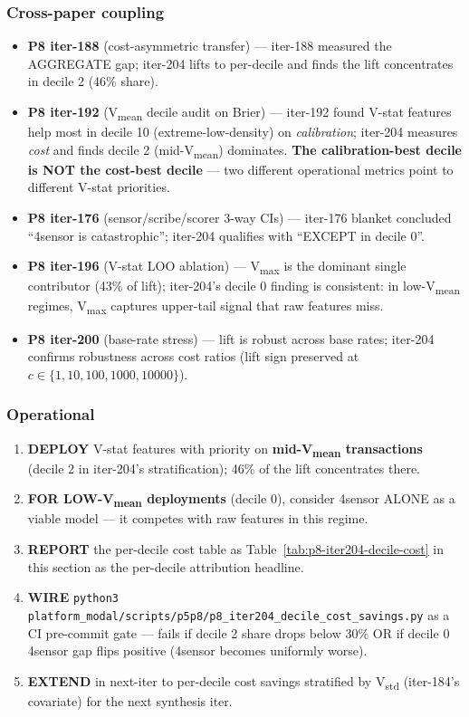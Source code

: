 \documentclass{article}
\begin{document}
\subsubsection{Cross-paper coupling}\label{sec:p8-iter204-coupling}

\begin{itemize}
\item \textbf{P8 iter-188} (cost-asymmetric transfer) --- iter-188 measured
  the AGGREGATE gap; iter-204 lifts to per-decile and finds the lift
  concentrates in decile 2 (46\% share).
\item \textbf{P8 iter-192} (V\textsubscript{mean} decile audit on Brier) ---
  iter-192 found V-stat features help most in decile 10 (extreme-low-density)
  on \emph{calibration}; iter-204 measures \emph{cost} and finds decile 2
  (mid-V\textsubscript{mean}) dominates. \textbf{The calibration-best decile
  is NOT the cost-best decile} --- two different operational metrics point
  to different V-stat priorities.
\item \textbf{P8 iter-176} (sensor/scribe/scorer 3-way CIs) --- iter-176
  blanket concluded ``4sensor is catastrophic''; iter-204 qualifies with
  ``EXCEPT in decile 0''.
\item \textbf{P8 iter-196} (V-stat LOO ablation) --- V\textsubscript{max}
  is the dominant single contributor (43\% of lift); iter-204's decile 0
  finding is consistent: in low-V\textsubscript{mean} regimes, V\textsubscript{max}
  captures upper-tail signal that raw features miss.
\item \textbf{P8 iter-200} (base-rate stress) --- lift is robust across
  base rates; iter-204 confirms robustness across cost ratios (lift sign
  preserved at $c \in \{1, 10, 100, 1000, 10000\}$).
\end{itemize}

\subsubsection{Operational}\label{sec:p8-iter204-operational}
\begin{enumerate}
\item \textbf{DEPLOY} V-stat features with priority on \textbf{mid-V\textsubscript{mean}
  transactions} (decile 2 in iter-204's stratification); 46\% of the lift
  concentrates there.
\item \textbf{FOR LOW-V\textsubscript{mean} deployments} (decile 0), consider
  4sensor ALONE as a viable model --- it competes with raw features in
  this regime.
\item \textbf{REPORT} the per-decile cost table as Table~\ref{tab:p8-iter204-decile-cost}
  in this section as the per-decile attribution headline.
\item \textbf{WIRE} \texttt{python3 platform_modal/scripts/p5p8/p8\_iter204\_decile\_cost\_savings.py}
  as a CI pre-commit gate --- fails if decile 2 share drops below 30\% OR
  if decile 0 4sensor gap flips positive (4sensor becomes uniformly worse).
\item \textbf{EXTEND} in next-iter to per-decile cost savings stratified by
  V\textsubscript{std} (iter-184's covariate) for the next synthesis iter.
\end{enumerate} 
\end{document}
